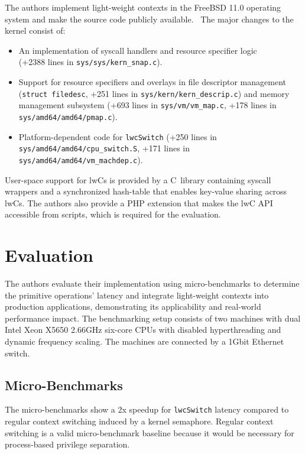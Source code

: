 \documentclass[10pt,twocolumn,a4paper]{article}
\begin{document}
The authors implement light-weight contexts in the FreeBSD 11.0 operating system and make the source code publicly available.~\cite{lwckernelrepo,lwclibsrepo} %
The major changes to the kernel consist of:
\begin{itemize}[nosep]
  \item An implementation of syscall handlers and resource specifier logic\\(+2388 lines in \texttt{sys/sys/kern\_snap.c}).
  \item Support for resource specifiers and overlays in
    file descriptor management (\lstinline{struct filedesc}, +251 lines in \texttt{sys/kern/kern\_descrip.c})
    and memory management subsystem  (+693 lines in \texttt{sys/vm/vm\_map.c}, +178 lines in \texttt{sys/amd64/amd64/pmap.c}).
  \item Platform-dependent code for \lstinline{lwcSwitch} (+250 lines in \texttt{sys/amd64/amd64/cpu\_switch.S}, +171 lines in \texttt{sys/amd64/amd64/vm\_machdep.c}).
\end{itemize}

User-space support for lwCs is provided by a C~library containing syscall wrappers and a synchronized hash-table that enables key-value sharing across lwCs.
The authors also provide a PHP extension that makes the lwC API accessible from scripts, which is required for the evaluation.

\section{Evaluation}\label{eval}
The authors evaluate their implementation using micro-benchmarks to determine the primitive operations' latency
and integrate light-weight contexts into production applications, demonstrating its applicability and real-world performance impact.
The benchmarking setup consists of two machines with dual Intel Xeon X5650 2.66GHz six-core CPUs with disabled hyperthreading and dynamic frequency scaling.
The machines are connected by a 1Gbit Ethernet switch.
\cite{lwcpaper}

\subsection{Micro-Benchmarks}
The micro-benchmarks show a 2x speedup for \lstinline{lwcSwitch} latency compared to regular context switching induced by a kernel semaphore.
Regular context switching is a valid micro-benchmark baseline because it would be necessary for process-based privilege separation.
\cite{lwcpaper}
\end{document}
